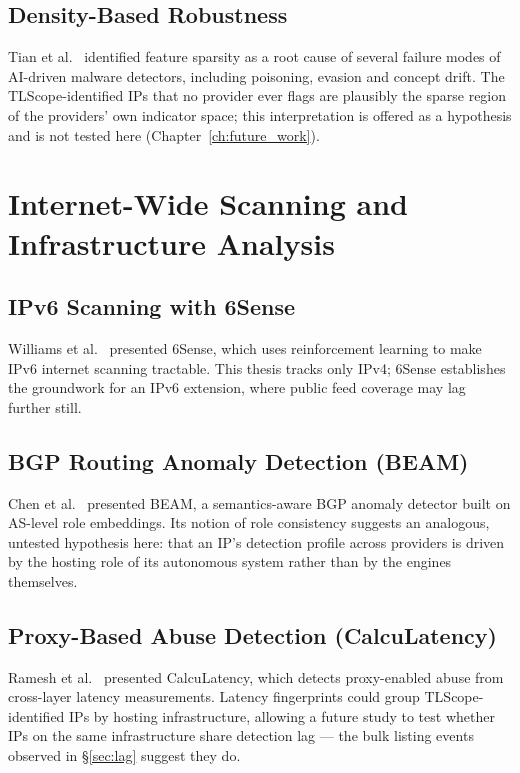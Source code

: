 \subsection{Density-Based Robustness}

Tian et al.\ \cite{tian2025density} identified feature sparsity as a root cause of several failure
modes of AI-driven malware detectors, including poisoning, evasion and concept drift. The
TLScope-identified IPs that no provider ever flags are plausibly the sparse region of the providers'
own indicator space; this interpretation is offered as a hypothesis and is not tested here
(Chapter~\ref{ch:future_work}).

\section{Internet-Wide Scanning and Infrastructure Analysis}

\subsection{IPv6 Scanning with 6Sense}

Williams et al.\ \cite{williams2024sixsense} presented 6Sense, which uses reinforcement learning to
make IPv6 internet scanning tractable. This thesis tracks only IPv4; 6Sense establishes the
groundwork for an IPv6 extension, where public feed coverage may lag further still.

\subsection{BGP Routing Anomaly Detection (BEAM)}

Chen et al.\ \cite{chen2024beam} presented BEAM, a semantics-aware BGP anomaly detector built on
AS-level role embeddings. Its notion of role consistency suggests an analogous, untested hypothesis
here: that an IP's detection profile across providers is driven by the hosting role of its
autonomous system rather than by the engines themselves.

\subsection{Proxy-Based Abuse Detection (CalcuLatency)}

Ramesh et al.\ \cite{ramesh2024calcuLatency} presented CalcuLatency, which detects proxy-enabled
abuse from cross-layer latency measurements. Latency fingerprints could group TLScope-identified IPs
by hosting infrastructure, allowing a future study to test whether IPs on the same infrastructure
share detection lag --- the bulk listing events observed in \S\ref{sec:lag} suggest they do.

